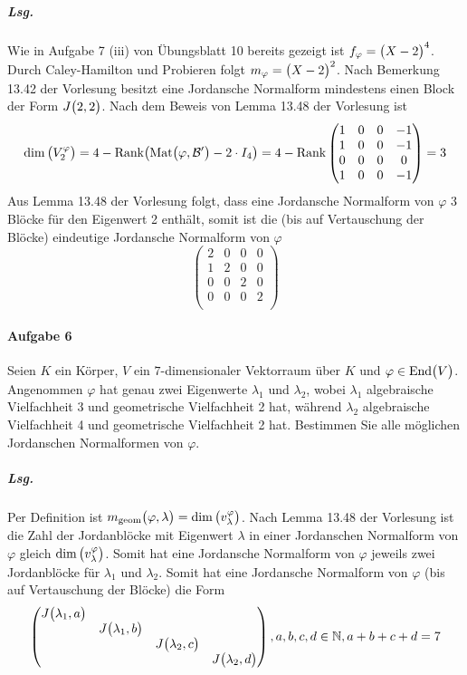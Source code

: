 \documentclass{scrreprt}
\newcommand{\End}{\text{End}}
\newcommand{\Mat}{\text{Mat}}
\newcommand{\Rank}{\text{Rank}}
\begin{document}
\begin{enumerate}[(i)]
  \subparagraph{Lsg.} Wie in Aufgabe 7 (iii) von Übungsblatt 10 bereits
  gezeigt ist $f_{\varphi} = \qty\big(X - 2)^4$.
  Durch Caley-Hamilton und Probieren folgt $m_{\varphi} = \qty\big(X - 2)^2$.
  Nach Bemerkung 13.42 der Vorlesung besitzt eine Jordansche Normalform
  mindestens einen Block der Form $J\qty\big(2, 2)$.
  Nach dem Beweis von Lemma 13.48 der Vorlesung ist
  \[
    \dim\qty\big(V_2^{\varphi}) =
    4 - \Rank\qty\big(\Mat\qty\big(\varphi, \mathcal{B}') - 2 \cdot I_4)
    = 4 - \Rank\begin{pmatrix}
      1 & 0 & 0 & -1 \\
      1 & 0 & 0 & -1 \\
      0 & 0 & 0 &  0 \\
      1 & 0 & 0 & -1 \\
    \end{pmatrix} = 3
  \]
  Aus Lemma 13.48 der Vorlesung folgt, dass eine Jordansche Normalform
  von $\varphi$ 3 Blöcke für den Eigenwert 2 enthält, somit ist die
  (bis auf Vertauschung der Blöcke) eindeutige Jordansche Normalform von
  $\varphi$
  \[
    \begin{pmatrix}
      2 & 0 & 0 & 0 \\
      1 & 2 & 0 & 0 \\
      0 & 0 & 2 & 0 \\
      0 & 0 & 0 & 2 \\
    \end{pmatrix}
  \]
\end{enumerate}

\paragraph{Aufgabe 6} Seien $K$ ein Körper, $V$ ein $7$-dimensionaler Vektorraum
über $K$ und $\varphi \in \End\qty\big(V)$.
Angenommen $\varphi$ hat genau zwei Eigenwerte $\lambda_1$ und $\lambda_2$, wobei
$\lambda_1$ algebraische Vielfachheit 3 und geometrische Vielfachheit 2 hat,
während $\lambda_2$ algebraische Vielfachheit 4 und geometrische Vielfachheit 2
hat.
Bestimmen Sie alle möglichen Jordanschen Normalformen von $\varphi$.

\subparagraph{Lsg.} Per Definition ist $m_{\text{geom}}\qty\big(\varphi, \lambda)
= \dim\qty\big(v_{\lambda}^{\varphi})$.
Nach Lemma 13.48 der Vorlesung ist die Zahl der Jordanblöcke mit Eigenwert
$\lambda$ in einer Jordanschen Normalform von $\varphi$ gleich
$\dim\qty\big(v_{\lambda}^{\varphi})$.
Somit hat eine Jordansche Normalform von $\varphi$ jeweils zwei Jordanblöcke für
$\lambda_1$ und $\lambda_2$.
Somit hat eine Jordansche Normalform von $\varphi$ (bis auf Vertauschung der
Blöcke) die Form
\[
  \begin{pmatrix}
    J\qty\big(\lambda_1, a) & & & \\
    & J\qty\big(\lambda_1, b) & & \\
    & & J\qty\big(\lambda_2, c) & \\
    & & & J\qty\big(\lambda_2, d) \\
  \end{pmatrix}, a, b, c, d \in \mathbb{N}, a + b + c + d = 7
\]
\end{document}
